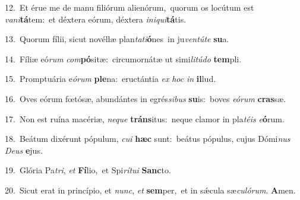 {\numbfont\textcolor{\numbcolor}{12.}}~Et érue me de manu filiórum alienórum,~\dagger quorum os locútum est \textit{va}\-\textit{ni}\textbf{tá}tem:~\star et déxtera eórum, déxtera \textit{in}\-\textit{i}\textit{qui}\textbf{tá}tis.\par
{\numbfont\textcolor{\numbcolor}{13.}}~Quorum fílii, sicut novéllæ plan\-\textit{ta}\-\textit{ti}\textbf{ó}nes~\star in ju\-\textit{ven}\-\textit{tú}\textit{te} \textbf{su}\-a.\par
{\numbfont\textcolor{\numbcolor}{14.}}~Fíliæ eó\textit{rum} \textit{com}\-\textbf{pó}sitæ:~\star circumornátæ ut simi\-\textit{li}\-\textit{tú}\textit{do} \textbf{tem}\-pli.\par
{\numbfont\textcolor{\numbcolor}{15.}}~Promptuária e\-\textit{ó}\-\textit{rum} \textbf{ple}\-na:~\star eructántia \textit{ex} \textit{hoc} \textit{in} \textbf{il}\-lud.\par
{\numbfont\textcolor{\numbcolor}{16.}}~Oves eórum fœtósæ, abundántes in egrés\-\textit{si}\-\textit{bus} \textbf{su}\-is:~\star boves \textit{e}\-\textit{ó}\textit{rum} \textbf{cras}\-sæ.\par
{\numbfont\textcolor{\numbcolor}{17.}}~Non est ruína macériæ, \textit{ne}\-\textit{que} \textbf{tráns}\-itus:~\star neque clamor in pla\-\textit{té}\-\textit{is} \textit{e}\-\textbf{ó}rum.\par
{\numbfont\textcolor{\numbcolor}{18.}}~Beátum dixérunt pópulum, \textit{cu}\-\textit{i} \textbf{hæc} sunt:~\star beátus pópulus, cujus Dómi\textit{nus} \textit{De}\-\textit{us} \textbf{e}\-jus.\par
{\numbfont\textcolor{\numbcolor}{19.}}~Glória Pa\-\textit{tri}\-, \textit{et} \textbf{Fí}\-lio,~\star et Spi\-\textit{rí}\-\textit{tu}\textit{i} \textbf{Sanc}\-to.\par
{\numbfont\textcolor{\numbcolor}{20.}}~Sicut erat in princípio, et \textit{nunc}\-, \textit{et} \textbf{sem}\-per,~\star et in sǽcula sæ\-\textit{cu}\-\textit{ló}\textit{rum}. \textbf{A}\-men.\par
